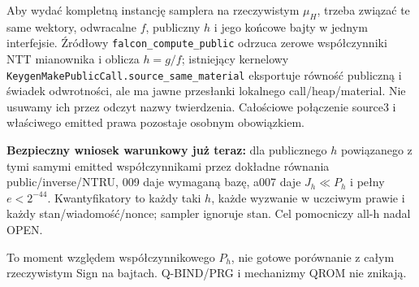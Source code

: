 \documentclass[11pt,a4paper]{article}
\newcommand{\code}[1]{\nolinkurl{#1}}
\begin{document}
Aby wydać kompletną instancję samplera na rzeczywistym $\mu_H$, trzeba
związać te same wektory, odwracalne $f$, publiczny $h$ i jego końcowe bajty
w jednym interfejsie. Źródłowy \code{falcon_compute_public} odrzuca zerowe
współczynniki NTT mianownika i oblicza $h=g/f$; istniejący kernelowy
\code{KeygenMakePublicCall.source_same_material} eksportuje równość publiczną
i świadek odwrotności, ale ma jawne przesłanki lokalnego call/heap/material.
Nie usuwamy ich przez odczyt nazwy twierdzenia. Całościowe połączenie
source3 i właściwego emitted prawa pozostaje osobnym obowiązkiem.

\textbf{Bezpieczny wniosek warunkowy już teraz:} dla publicznego $h$
powiązanego z tymi samymi emitted współczynnikami przez dokładne równania
public/inverse/NTRU, 009 daje wymaganą bazę, a007 daje $J_h\ll P_h$ i
pełny $e<2^{-44}$. Kwantyfikatory to każdy taki $h$, każde wyzwanie w
uczciwym prawie i każdy stan/wiadomość/nonce; sampler ignoruje stan.
Cel pomocniczy all-h nadal OPEN.

To moment względem współczynnikowego $P_h$, nie gotowe porównanie z całym
rzeczywistym Sign na bajtach. Q-BIND/PRG i mechanizmy QROM nie znikają.
\end{document}
